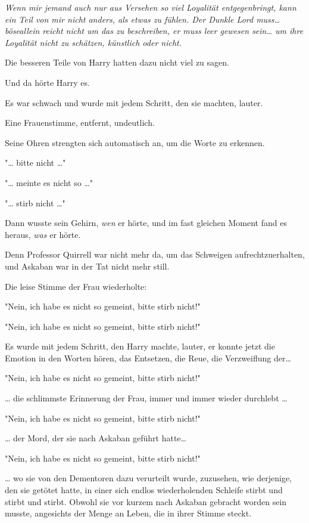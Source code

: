 {\emph{\emph{Wenn mir jemand auch nur aus Versehen so viel Loyalität entgegenbringt, kann ein Teil von mir nicht anders, als etwas zu fühlen. Der Dunkle Lord muss…} böse\emph{allein reicht nicht um das zu beschreiben, er muss leer gewesen sein… um ihre Loyalität nicht zu schätzen, künstlich oder nicht.}}

Die besseren Teile von Harry hatten dazu nicht viel zu sagen.

Und da hörte Harry es.

Es war schwach und wurde mit jedem Schritt, den sie machten, lauter.

Eine Frauenstimme, entfernt, undeutlich.

Seine Ohren strengten sich automatisch an, um die Worte zu erkennen.

"… bitte nicht …"

"… meinte es nicht so …"

"… stirb nicht …"

Dann wusste sein Gehirn, \emph{wen} er hörte, und im fast gleichen Moment fand es heraus, \emph{was} er hörte.

Denn Professor Quirrell war nicht mehr da, um das Schweigen aufrechtzuerhalten, und Askaban war in der Tat nicht mehr still.

Die leise Stimme der Frau wiederholte:

"Nein, ich habe es nicht so gemeint, bitte stirb nicht!"

"Nein, ich habe es nicht so gemeint, bitte stirb nicht!"

Es wurde mit jedem Schritt, den Harry machte, lauter, er konnte jetzt die Emotion in den Worten hören, das Entsetzen, die Reue, die Verzweiflung der…

"Nein, ich habe es nicht so gemeint, bitte stirb nicht!"

… die schlimmste Erinnerung der Frau, immer und immer wieder durchlebt …

"Nein, ich habe es nicht so gemeint, bitte stirb nicht!"

… der Mord, der sie nach Askaban geführt hatte…

"Nein, ich habe es nicht so gemeint, bitte stirb nicht!"

… wo sie von den Dementoren dazu verurteilt wurde, zuzusehen, wie derjenige, den sie getötet hatte, in einer sich endlos wiederholenden Schleife stirbt und stirbt und stirbt. Obwohl sie vor kurzem nach Askaban gebracht worden sein musste, angesichts der Menge an Leben, die in ihrer Stimme steckt.

}
